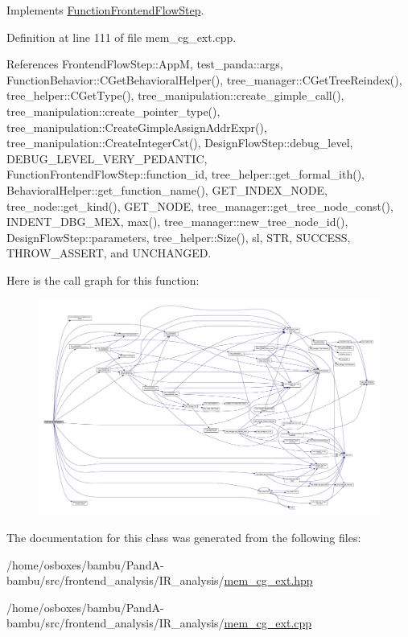 Implements \hyperlink{classFunctionFrontendFlowStep_a00612f7fb9eabbbc8ee7e39d34e5ac68}{Function\+Frontend\+Flow\+Step}.



Definition at line 111 of file mem\+\_\+cg\+\_\+ext.\+cpp.



References Frontend\+Flow\+Step\+::\+AppM, test\+\_\+panda\+::args, Function\+Behavior\+::\+C\+Get\+Behavioral\+Helper(), tree\+\_\+manager\+::\+C\+Get\+Tree\+Reindex(), tree\+\_\+helper\+::\+C\+Get\+Type(), tree\+\_\+manipulation\+::create\+\_\+gimple\+\_\+call(), tree\+\_\+manipulation\+::create\+\_\+pointer\+\_\+type(), tree\+\_\+manipulation\+::\+Create\+Gimple\+Assign\+Addr\+Expr(), tree\+\_\+manipulation\+::\+Create\+Integer\+Cst(), Design\+Flow\+Step\+::debug\+\_\+level, D\+E\+B\+U\+G\+\_\+\+L\+E\+V\+E\+L\+\_\+\+V\+E\+R\+Y\+\_\+\+P\+E\+D\+A\+N\+T\+IC, Function\+Frontend\+Flow\+Step\+::function\+\_\+id, tree\+\_\+helper\+::get\+\_\+formal\+\_\+ith(), Behavioral\+Helper\+::get\+\_\+function\+\_\+name(), G\+E\+T\+\_\+\+I\+N\+D\+E\+X\+\_\+\+N\+O\+DE, tree\+\_\+node\+::get\+\_\+kind(), G\+E\+T\+\_\+\+N\+O\+DE, tree\+\_\+manager\+::get\+\_\+tree\+\_\+node\+\_\+const(), I\+N\+D\+E\+N\+T\+\_\+\+D\+B\+G\+\_\+\+M\+EX, max(), tree\+\_\+manager\+::new\+\_\+tree\+\_\+node\+\_\+id(), Design\+Flow\+Step\+::parameters, tree\+\_\+helper\+::\+Size(), sl, S\+TR, S\+U\+C\+C\+E\+SS, T\+H\+R\+O\+W\+\_\+\+A\+S\+S\+E\+RT, and U\+N\+C\+H\+A\+N\+G\+ED.

Here is the call graph for this function\+:
\nopagebreak
\begin{figure}[H]
\begin{center}
\leavevmode
\includegraphics[width=350pt]{df/da8/classmem__cg__ext_aec306532229120aabaacf2a9602648c2_cgraph}
\end{center}
\end{figure}


The documentation for this class was generated from the following files\+:\begin{DoxyCompactItemize}
\item 
/home/osboxes/bambu/\+Pand\+A-\/bambu/src/frontend\+\_\+analysis/\+I\+R\+\_\+analysis/\hyperlink{mem__cg__ext_8hpp}{mem\+\_\+cg\+\_\+ext.\+hpp}\item 
/home/osboxes/bambu/\+Pand\+A-\/bambu/src/frontend\+\_\+analysis/\+I\+R\+\_\+analysis/\hyperlink{mem__cg__ext_8cpp}{mem\+\_\+cg\+\_\+ext.\+cpp}\end{DoxyCompactItemize}
